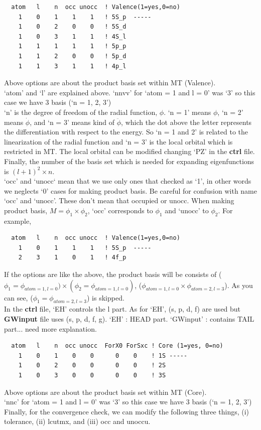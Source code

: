 \documentclass[a4paper,10pt,epsf,fleqn]{article}
\begin{document}
{\begin{enumerate}
\begin{verbatim}
  atom   l    n  occ unocc  ! Valence(1=yes,0=no)
    1    0    1    1    1   ! 5S_p  -----
    1    0    2    0    0   ! 5S_d
    1    0    3    1    1   ! 4S_l
    1    1    1    1    1   ! 5p_p
    1    1    2    0    0   ! 5p_d
    1    1    3    1    1   ! 4p_l
\end{verbatim}
Above options are about the product basis set within MT (Valence).\\
`atom' and `l' are explained above. `nnvv' for `atom = 1 and l = 0' was `3' so this case we have 3 basis (`n = 1, 2, 3')\\
`n' is the degree of freedom of the radial function, $\phi$. `n = 1'
      means $\phi$, `n = 2' means $\dot\phi$, and `n = 3' means kind of
      $\ddot\phi$, which the dot above the letter represents the
      differentiation with respect to the energy. So `n = 1 and 2' is
      related to the linearization of the radial function and `n = 3' is
      the local orbital which is restricted in MT. The local orbital can
      be modified changing `PZ' in the {\bf ctrl} file. Finally, the
      number of the basis set which is needed for expanding eigenfunctions is $(l+1)^2 \times n$.\\
`occ' and `unocc` mean that we use only ones that checked as `1', in other words we neglects `0' cases for making product basis. Be careful for confusion with name `occ' and `unocc'. These don't mean that occupied or unocc. When making product basis, $M = \phi_1 \times \phi_2$, `occ' corresponds to $\phi_1$ and `unocc' to $\phi_2$. For example, 
\begin{verbatim}
  atom   l    n  occ unocc  ! Valence(1=yes,0=no)
    1    0    1    1    1   ! 5S_p  -----
    2    3    1    0    1   ! 4f_p
\end{verbatim}
If the options are like the above, the product basis will be consists of ($\phi_1 = \phi_{atom=1,l=0}) \times (\phi_2 = \phi_{atom=1,l=0})$, ($\phi_{atom=1,l=0} \times \phi_{atom=2,l=3}$). As you can see, ($\phi_1 = \phi_{atom=2,l=3}$) is skipped.\\
In the {\bf ctrl} file, `EH' controls the l part. As for `EH', (s, p, d, f) are used but {\bf GWinput} file uses (s, p, d, f, g). `EH' : HEAD part. `GWinput' : contains TAIL part... need more explanation.

\begin{verbatim}
  atom   l    n  occ unocc  ForX0 ForSxc ! Core (1=yes, 0=no)
    1    0    1    0    0      0    0    ! 1S -----
    1    0    2    0    0      0    0    ! 2S
    1    0    3    0    0      0    0    ! 3S
\end{verbatim}
Above options are about the product basis set within MT (Core).\\
`nnc' for `atom = 1 and l = 0' was `3' so this case we have 3 basis (`n = 1, 2, 3')\\
Finally, for the convergence check, we can modify the following three things, (i) tolerance, (ii) lcutmx, and (iii) occ and unoccu.



\end{enumerate}}
\end{document}
